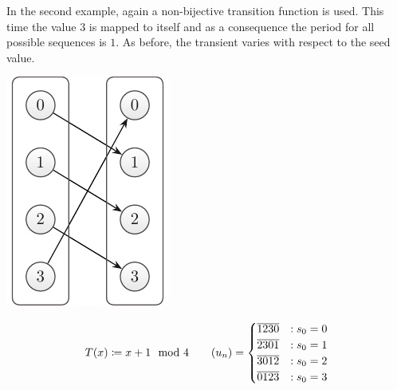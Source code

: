 \documentclass{stdlocal}
\begin{document}
  \noindent
  In the second example, again a non-bijective transition function is used.
  This time the value $3$ is mapped to itself and as a consequence the period for all possible sequences is $1$.
  As before, the transient varies with respect to the seed value.

  \medskip
  \begin{minipage}{0.2\textwidth}
    \includegraphics[width=\textwidth]{figures/periodicity_example_c.pdf}
  \end{minipage}
  \hfill
  \begin{minipage}{0.73\textwidth}
    \[
      T(x) \coloneqq x + 1 \mod 4
    \qquad
      (u_n) =
      \begin{cases}
        \overline{1230} &: s_0 = 0 \\
        \overline{2301} &: s_0 = 1 \\
        \overline{3012} &: s_0 = 2 \\
        \overline{0123} &: s_0 = 3
      \end{cases}
    \]
  \end{minipage}
  \medskip
\end{document}
